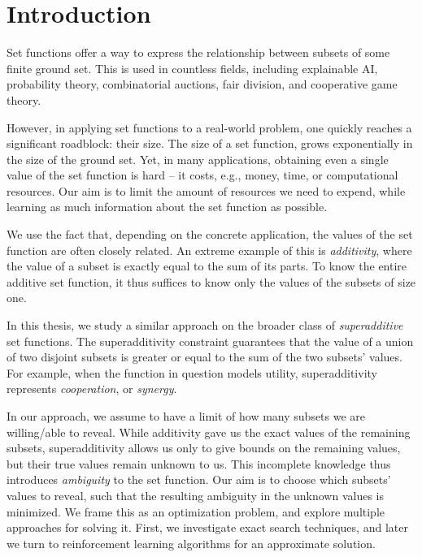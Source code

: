 \chapter*{Introduction}

Set functions offer a way to express the relationship between subsets of some finite ground set.
This is used in countless fields, including explainable AI, probability theory, combinatorial auctions, fair division, and cooperative game theory.

However, in applying set functions to a real-world problem, one quickly reaches a significant roadblock: their size.
The size of a set function, grows exponentially in the size of the ground set.
Yet, in many applications, obtaining even a single value of the set function is hard -- it  costs, e.g., money, time, or computational resources.
Our aim is to limit the amount of resources we need to expend, while learning as much information about the set function as possible.

We use the fact that, depending on the concrete application, the values of the set function are often closely related.
An extreme example of this is \emph{additivity}, where the value of a subset is exactly equal to the sum of  its  parts.
To know the entire additive set function, it thus suffices to know only the values of the subsets of size one.

In this thesis, we study a similar approach on the broader class of \emph{superadditive} set functions.
The superadditivity constraint guarantees that the value of a union of two disjoint subsets is greater or equal to the sum of the two subsets' values.
For example, when the function in question models utility, superadditivity represents \emph{cooperation}, or \emph{synergy}.


In our approach, we assume to have a limit of how many subsets we are willing/able to reveal.
While additivity gave us the exact values of the remaining subsets, superadditivity allows us only to give bounds on the remaining values, but their true values remain unknown to us.
This incomplete knowledge thus introduces \emph{ambiguity} to the set function.
Our aim is to choose which subsets' values to reveal, such that the resulting ambiguity in the unknown values is minimized.
We frame this as an optimization problem, and explore multiple approaches for solving it.
First, we investigate exact search techniques, and later we turn to reinforcement learning algorithms for an approximate solution.

